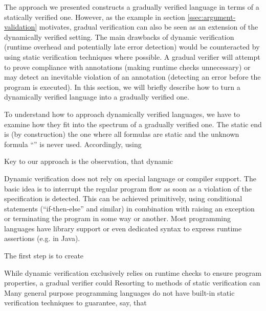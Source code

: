 The approach we presented constructs a gradually verified language in terms of a statically verified one.
However, as the example in section \ref{ssec:argument-validation} motivates, gradual verification can also be seen as an extension of the dynamically verified setting.
The main drawbacks of dynamic verification (runtime overhead and potentially late error detection) would be counteracted by using static verification techniques where possible.
A gradual verifier will attempt to prove compliance with annotations (making runtime checks unnecessary) or may detect an inevitable violation of an annotation (detecting an error before the program is executed).
In this section, we will briefly describe how to turn a dynamically verified language into a gradually verified one.

To understand how to approach dynamically verified languages, we have to examine how they fit into the spectrum of a gradually verified one.
The static end is (by construction) the one where all formulas are static and the unknown formula “\ttt{\qm}” is never used.
Accordingly, using 

Key to our approach is the observation, that dynamic



Dynamic verification does not rely on special language or compiler support.
The basic idea is to interrupt the regular program flow as soon as a violation of the specification is detected.
This can be achieved primitively, using conditional statements (“if-then-else” and similar) in combination with raising an exception or terminating the program in some way or another.
Most programming languages have library support or even dedicated syntax to express runtime assertions (e.g.  in Java).


The first step is to create 



While dynamic verification exclusively relies on runtime checks to ensure program properties, a gradual verifier could 
Resorting to methods of static verification can 
Many general purpose programming languages do not have built-in static verification techniques to guarantee, say, that 